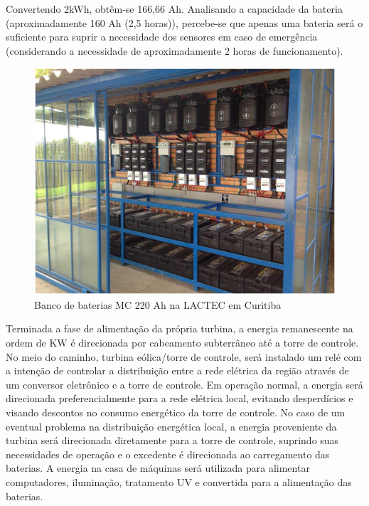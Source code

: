 Convertendo 2kWh, obtêm-se 166,66 Ah. Analisando a capacidade da bateria (aproximadamente 160 Ah (2,5 horas)), percebe-se que apenas uma bateria será o suficiente para suprir a necessidade dos sensores em caso de emergência (considerando a necessidade de aproximadamente 2 horas de funcionamento).

\FloatBarrier
\begin{figure}[!ht]
\centering
\includegraphics[scale=0.6]{editaveis/figuras/banco_bateria}
\caption[Banco baterias]{Banco de baterias MC 220 Ah na LACTEC em Curitiba\footnotemark}
\label{banco_bateria}
\end{figure}
\FloatBarrier

Terminada a fase de alimentação da própria turbina, a energia remanescente na ordem de KW é direcionada por cabeamento subterrâneo até a torre de controle. No meio do caminho, turbina eólica/torre de controle, será instalado um relé com a intenção de controlar a distribuição entre a rede elétrica da região através de um conversor eletrônico e a torre de controle. Em operação normal, a energia será direcionada preferencialmente para a rede elétrica local, evitando desperdícios e visando descontos no consumo energético da torre de controle. No caso de um eventual problema na distribuição energética local, a energia proveniente da turbina será direcionada diretamente para a torre de controle, suprindo suas necessidades de operação e o excedente é direcionada ao carregamento das baterias. A energia na casa de máquinas será utilizada para alimentar computadores, iluminação, tratamento UV e convertida para a alimentação das baterias. 

